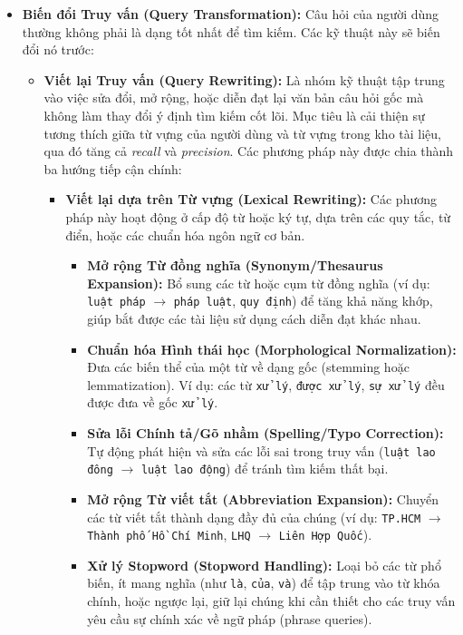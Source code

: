 \begin{itemize}
    \item \textbf{Biến đổi Truy vấn (Query Transformation):} Câu hỏi của người dùng thường không phải là dạng tốt nhất để tìm kiếm. Các kỹ thuật này sẽ biến đổi nó trước:
        \begin{itemize}
        \item \textbf{Viết lại Truy vấn (Query Rewriting):} Là nhóm kỹ thuật tập trung vào việc sửa đổi, mở rộng, hoặc diễn đạt lại văn bản câu hỏi gốc mà không làm thay đổi ý định tìm kiếm cốt lõi. Mục tiêu là cải thiện sự tương thích giữa từ vựng của người dùng và từ vựng trong kho tài liệu, qua đó tăng cả \textit{recall} và \textit{precision}. Các phương pháp này được chia thành ba hướng tiếp cận chính:
    
        \begin{itemize}
            \item \textbf{Viết lại dựa trên Từ vựng (Lexical Rewriting):} 
            Các phương pháp này hoạt động ở cấp độ từ hoặc ký tự, dựa trên các quy tắc, từ điển, hoặc các chuẩn hóa ngôn ngữ cơ bản.
            \begin{itemize}
                \item \textbf{Mở rộng Từ đồng nghĩa (Synonym/Thesaurus Expansion):} Bổ sung các từ hoặc cụm từ đồng nghĩa (ví dụ: \texttt{luật pháp} $\rightarrow$ \texttt{pháp luật}, \texttt{quy định}) để tăng khả năng khớp, giúp bắt được các tài liệu sử dụng cách diễn đạt khác nhau.
                \item \textbf{Chuẩn hóa Hình thái học (Morphological Normalization):} Đưa các biến thể của một từ về dạng gốc (stemming hoặc lemmatization). Ví dụ: các từ \texttt{xử lý}, \texttt{được xử lý}, \texttt{sự xử lý} đều được đưa về gốc \texttt{xử lý}.
                \item \textbf{Sửa lỗi Chính tả/Gõ nhầm (Spelling/Typo Correction):} Tự động phát hiện và sửa các lỗi sai trong truy vấn (\texttt{luật lao đông} $\rightarrow$ \texttt{luật lao động}) để tránh tìm kiếm thất bại.
                \item \textbf{Mở rộng Từ viết tắt (Abbreviation Expansion):} Chuyển các từ viết tắt thành dạng đầy đủ của chúng (ví dụ: \texttt{TP.HCM} $\rightarrow$ \texttt{Thành phố Hồ Chí Minh}, \texttt{LHQ} $\rightarrow$ \texttt{Liên Hợp Quốc}).
                \item \textbf{Xử lý Stopword (Stopword Handling):} Loại bỏ các từ phổ biến, ít mang nghĩa (như \texttt{là}, \texttt{của}, \texttt{và}) để tập trung vào từ khóa chính, hoặc ngược lại, giữ lại chúng khi cần thiết cho các truy vấn yêu cầu sự chính xác về ngữ pháp (phrase queries).
            \end{itemize}
    

\end{itemize}
\end{itemize}
\end{itemize}
